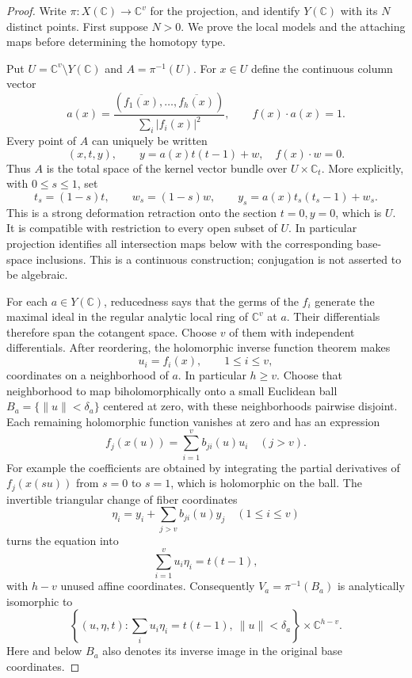 \begin{proof}
Write $\pi:X(\mathbb C)\to\mathbb C^v$ for the projection, and identify
$Y(\mathbb C)$ with its $N$ distinct points. First suppose $N>0$.
We prove the local models and the attaching maps before determining
the homotopy type.

Put $U=\mathbb C^v\setminus Y(\mathbb C)$ and
$A=\pi^{-1}(U)$. For $x\in U$ define the continuous column vector
\[
 a(x)=\frac{(\overline{f_1(x)},\ldots,\overline{f_h(x)})}
                  {\sum_i|f_i(x)|^2},\qquad f(x)\cdot a(x)=1.
\]
Every point of $A$ can uniquely be written
\[
       (x,t,y),\qquad y=a(x)t(t-1)+w,\quad f(x)\cdot w=0.
\]
Thus $A$ is the total space of the kernel vector bundle over
$U\times\mathbb C_t$. More explicitly, with $0\leq s\leq1$, set
\[
 t_s=(1-s)t,\qquad w_s=(1-s)w,\qquad
 y_s=a(x)t_s(t_s-1)+w_s.
\]
This is a strong deformation retraction onto the section $t=0,y=0$,
which is $U$. It is compatible with restriction to every open subset
of $U$. In particular projection identifies all intersection maps
below with the corresponding base-space inclusions. This is a
continuous construction; conjugation is not asserted to be algebraic.

For each $a\in Y(\mathbb C)$, reducedness says that the germs of the
$f_i$ generate the maximal ideal in the regular analytic local ring
of $\mathbb C^v$ at $a$. Their differentials therefore span the
cotangent space. Choose $v$ of them with independent differentials.
After reordering, the holomorphic inverse function theorem makes
\[
                    u_i=f_i(x),\qquad 1\leq i\leq v,
\]
coordinates on a neighborhood of $a$. In particular $h\geq v$.
Choose that neighborhood to map biholomorphically onto a small
Euclidean ball $B_a=\{\|u\|<\delta_a\}$ centered at zero, with these
neighborhoods pairwise disjoint. Each remaining holomorphic function
vanishes at zero and has an expression
\[
 f_j(x(u))=\sum_{i=1}^v b_{ji}(u)u_i\quad(j>v).
\]
For example the coefficients are obtained by integrating the partial
derivatives of $f_j(x(su))$ from $s=0$ to $s=1$, which is holomorphic
on the ball. The invertible triangular change of fiber coordinates
\[
 \eta_i=y_i+\sum_{j>v}b_{ji}(u)y_j\quad(1\leq i\leq v)
\]
turns the equation into
\[
                 \sum_{i=1}^v u_i\eta_i=t(t-1),
\]
with $h-v$ unused affine coordinates. Consequently
$V_a=\pi^{-1}(B_a)$ is analytically isomorphic to
\[
 \left\{(u,\eta,t):\sum_i u_i\eta_i=t(t-1),\ \|u\|<\delta_a\right\}
                   \times\mathbb C^{h-v}.
\]
Here and below $B_a$ also denotes its inverse image in the original
base coordinates.


\end{proof}
